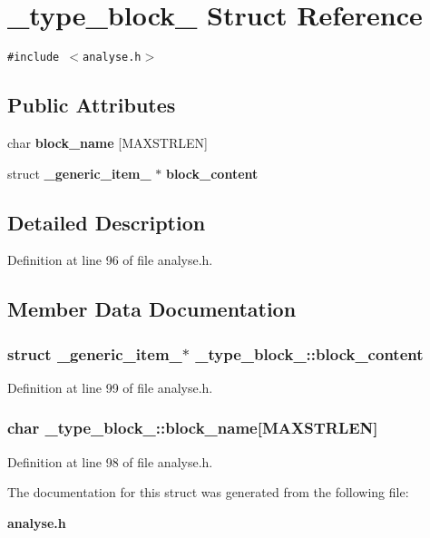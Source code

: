 \section{\_\-type\_\-block\_\- Struct Reference}
\label{struct__type__block__}
{\tt \#include $<$analyse.h$>$}

\subsection*{Public Attributes}
\begin{CompactItemize}
\item 
char {\bf block\_\-name} [MAXSTRLEN]
\item 
struct {\bf \_\-generic\_\-item\_\-} $\ast$ {\bf block\_\-content}
\end{CompactItemize}


\subsection{Detailed Description}


Definition at line 96 of file analyse.h.

\subsection{Member Data Documentation}
\subsubsection[{block\_\-content}]{\setlength{\rightskip}{0pt plus 5cm}struct {\bf \_\-generic\_\-item\_\-}$\ast$ {\bf \_\-type\_\-block\_\-::block\_\-content}\hspace{0.3cm}{\tt  [read]}}\label{struct__type__block___85da2291e1fe11627ceeb2eede0501a3}




Definition at line 99 of file analyse.h.
\subsubsection[{block\_\-name}]{\setlength{\rightskip}{0pt plus 5cm}char {\bf \_\-type\_\-block\_\-::block\_\-name}[MAXSTRLEN]}\label{struct__type__block___2cedecc4602de156f0226057a759d038}




Definition at line 98 of file analyse.h.

The documentation for this struct was generated from the following file:\begin{CompactItemize}
\item 
{\bf analyse.h}\end{CompactItemize}
